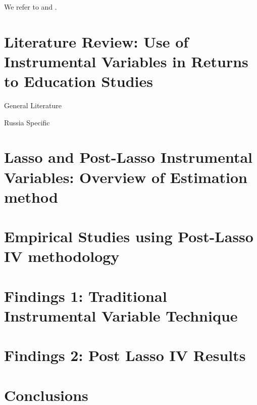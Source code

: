 \documentclass[alpha-refs]{wiley-article-04t}
\begin{document}
We refer to \cite{card_070._1999} and . 


\section{Literature Review: Use of Instrumental Variables in Returns to Education Studies}

General Literature

Russia Specific

\section{Lasso and Post-Lasso Instrumental Variables: Overview of Estimation method}

\lipsum[2]

\lipsum[3]

\lipsum[4]

\section{Empirical Studies using Post-Lasso IV methodology}

\lipsum[5]

\lipsum[6]

\lipsum[7]


\section{Findings 1: Traditional Instrumental Variable Technique}

\lipsum[1]

\lipsum[2]

\lipsum[3]


\section{Findings 2: Post Lasso IV Results}

\lipsum[6]

\lipsum[9]

\lipsum[3]


\section{Conclusions}

\lipsum[1]

\lipsum[4]

\lipsum[3]

\printbibliography
\end{document}

